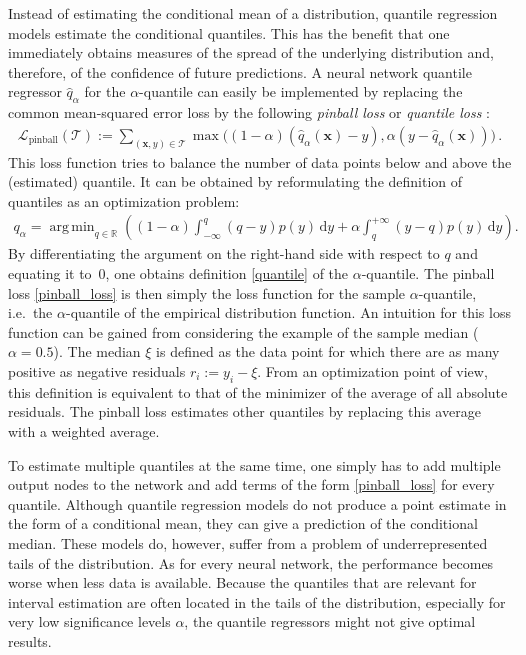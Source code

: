 \documentclass[smallcondensed]{svjour3}
\newcommand{\intd}{\,\mathrm{d}}
\DeclareMathOperator*{\argmin}{arg\,min}
\begin{document}
    Instead of estimating the conditional mean of a distribution, quantile regression models estimate the conditional quantiles. This has the benefit that one immediately obtains measures of the spread of the underlying distribution and, therefore, of the confidence of future predictions. A neural network quantile regressor $\hat{q}_\alpha$ for the $\alpha$-quantile can easily be implemented by replacing the common mean-squared error loss by the following \textit{pinball loss} or \textit{quantile loss} \cite{koenker2001quantile}:
    \begin{gather}
        \label{pinball_loss}
        \mathcal{L}_{\text{pinball}}(\mathcal{T}) := \sum_{(\mathbf{x},y)\in\mathcal{T}} \max\Big((1-\alpha)(\hat{q}_\alpha(\mathbf{x})-y), \alpha(y-\hat{q}_\alpha(\mathbf{x}))\Big)\,.
    \end{gather}
    This loss function tries to balance the number of data points below and above the (estimated) quantile. It can be obtained by reformulating the definition of quantiles as an optimization problem:
    \begin{gather}
        q_\alpha = \argmin_{q\in\mathbb{R}}\left((1-\alpha)\int_{-\infty}^q(q-y)p(y)\intd y + \alpha\int_q^{+\infty}(y-q)p(y)\intd y\right).
    \end{gather}
    By differentiating the argument on the right-hand side with respect to $q$ and equating it to~0, one obtains definition \eqref{quantile} of the $\alpha$-quantile. The pinball loss \eqref{pinball_loss} is then simply the loss function for the sample $\alpha$-quantile, i.e.\ the $\alpha$-quantile of the empirical distribution function. An intuition for this loss function can be gained from considering the example of the sample median ($\alpha=0.5$). The median $\xi$ is defined as the data point for which there are as many positive as negative residuals $r_i:=y_i-\xi$. From an optimization point of view, this definition is equivalent to that of the minimizer of the average of all absolute residuals. The pinball loss estimates other quantiles by replacing this average with a weighted average.

    To estimate multiple quantiles at the same time, one simply has to add multiple output nodes to the network and add terms of the form \eqref{pinball_loss} for every quantile. Although quantile regression models do not produce a point estimate in the form of a conditional mean, they can give a prediction of the conditional median. These models do, however, suffer from a problem of underrepresented tails of the distribution. As for every neural network, the performance becomes worse when less data is available. Because the quantiles that are relevant for interval estimation are often located in the tails of the distribution, especially for very low significance levels $\alpha$, the quantile regressors might not give optimal results.
\end{document}

